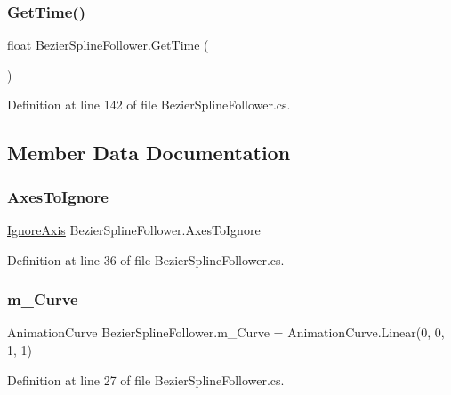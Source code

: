 \subsubsection{\texorpdfstring{Get\+Time()}{GetTime()}}
{\footnotesize\ttfamily float Bezier\+Spline\+Follower.\+Get\+Time (\begin{DoxyParamCaption}{ }\end{DoxyParamCaption})}



Definition at line 142 of file Bezier\+Spline\+Follower.\+cs.



\subsection{Member Data Documentation}
\mbox{\label{class_bezier_spline_follower_a93464a77def4cdfa03248a7be07c3eff}} 
\subsubsection{\texorpdfstring{Axes\+To\+Ignore}{AxesToIgnore}}
{\footnotesize\ttfamily \mbox{\hyperlink{_ignore_axis_8cs_aa61b0141055d583a4f5b013297a1d48f}{Ignore\+Axis}} Bezier\+Spline\+Follower.\+Axes\+To\+Ignore}



Definition at line 36 of file Bezier\+Spline\+Follower.\+cs.

\mbox{\label{class_bezier_spline_follower_a924000fca223028d37b074e9e12a2adb}} 
\subsubsection{\texorpdfstring{m\+\_\+\+Curve}{m\_Curve}}
{\footnotesize\ttfamily Animation\+Curve Bezier\+Spline\+Follower.\+m\+\_\+\+Curve = Animation\+Curve.\+Linear(0, 0, 1, 1)}



Definition at line 27 of file Bezier\+Spline\+Follower.\+cs.

